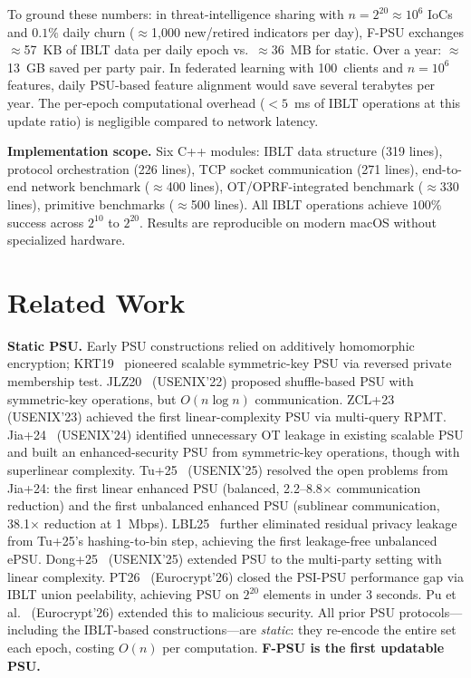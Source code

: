 \documentclass[letterpaper,twocolumn,10pt]{article}
\theoremstyle{definition}
\begin{document}
To ground these numbers: in threat-intelligence sharing with $n = 2^{20}
\approx 10^6$ IoCs and $0.1\%$ daily churn ($\approx$1,000 new/retired
indicators per day), F-PSU exchanges $\approx$57~KB of IBLT data per daily
epoch vs.\ $\approx$36~MB for static. Over a year: $\approx$13~GB saved per
party pair. In federated learning with 100~clients and $n = 10^6$ features,
daily PSU-based feature alignment would save several terabytes per year. The
per-epoch computational overhead ($<5$~ms of IBLT operations at this update
ratio) is negligible compared to network latency.

\textbf{Implementation scope.} Six C++ modules: IBLT data structure (319
lines), protocol orchestration (226 lines), TCP socket communication (271
lines), end-to-end network benchmark ($\approx$400 lines), OT/OPRF-integrated
benchmark ($\approx$330 lines), primitive benchmarks ($\approx$500 lines). All
IBLT operations achieve $100\%$ success across $2^{10}$ to $2^{20}$. Results
are reproducible on modern macOS without specialized hardware.

\section{Related Work}
\label{sec:related}

\textbf{Static PSU.} Early PSU constructions relied on additively homomorphic
encryption; KRT19~\cite{KRT19} pioneered scalable symmetric-key PSU via
reversed private membership test. JLZ20~\cite{JLZ20} (USENIX'22) proposed shuffle-based
PSU with symmetric-key operations, but $O(n \log n)$ communication.
ZCL+23~\cite{ZCL+23} (USENIX'23) achieved the first linear-complexity PSU via
multi-query RPMT. Jia+24~\cite{Jia+24} (USENIX'24) identified unnecessary OT
leakage in existing scalable PSU and built an enhanced-security PSU from
symmetric-key operations, though with superlinear complexity. Tu+25~\cite{Tu+25}
(USENIX'25) resolved the open problems from Jia+24: the first linear enhanced
PSU (balanced, 2.2--8.8$\times$ communication reduction) and the first unbalanced
enhanced PSU (sublinear communication, 38.1$\times$ reduction at 1~Mbps).
LBL25~\cite{LBL25} further eliminated residual privacy leakage from
Tu+25's hashing-to-bin step, achieving the first leakage-free unbalanced ePSU.
Dong+25~\cite{Dong+25} (USENIX'25) extended PSU to the multi-party setting with
linear complexity. PT26~\cite{PT26} (Eurocrypt'26) closed the PSI-PSU
performance gap via IBLT union peelability, achieving PSU on $2^{20}$ elements
in under 3 seconds. Pu et al.~\cite{PuGT26} (Eurocrypt'26) extended this to
malicious security. All prior PSU protocols---including the IBLT-based
constructions---are \emph{static}: they re-encode the entire set each epoch,
costing $O(n)$ per computation. \textbf{F-PSU is the first updatable PSU.}
\end{document}
